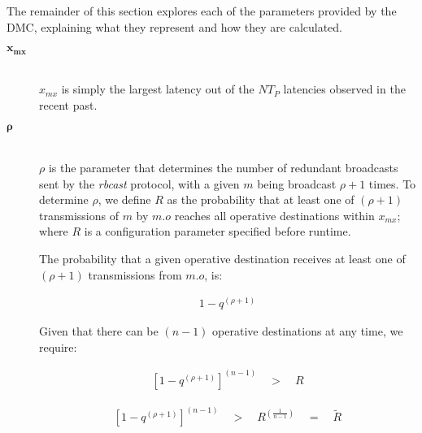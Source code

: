         The remainder of this section explores each of the parameters provided by the DMC, explaining what they represent and how they are calculated.  
        
        \begin{description}
        \item[\Huge$\boldsymbol{x_{mx}}$] \hfill \\
        $x_{mx}$ is simply the largest latency out of the $NT_P$ latencies observed in the recent past.  
        
        \item[\Huge$\boldsymbol{\rho}$] \hfill \\
        $\rho$ is the parameter that determines the number of redundant broadcasts sent by the \emph{rbcast} protocol, with a given $m$ being broadcast $\rho + 1$ times.  To determine $\rho$, we define $R$ as the probability that at least one of $(\rho + 1)$ transmissions of $m$ by $m.o$ reaches all operative destinations within $x_{mx}$; where $R$ is a configuration parameter specified before runtime.  
        
        The probability that a given operative destination receives at least one of $(\rho + 1)$ transmissions from $m.o$, is:
        
        \begin{equation}
            \begin{aligned}
                1 - q^{\left( \rho + 1 \right)}
            \end{aligned}
        \end{equation}
        
        Given that there can be $(n - 1)$ operative destinations at any time, we require:
        
        \begin{equation}
            \begin{aligned}
                \left[1 - q^{\left(\rho + 1\right)}\right]^{\left(n - 1\right)} \quad > \quad R
            \end{aligned}
        \end{equation}
        
        \begin{equation} \label{eq:q_mx}
            \begin{aligned}
                \left[1 - q^{\left(\rho + 1\right)}\right]^{\left(n - 1\right)} \quad > \quad R ^{\left(\frac{1}{n - 1}\right)} \quad = \quad \tilde{R}
            \end{aligned}
        \end{equation}
        

\end{description}

